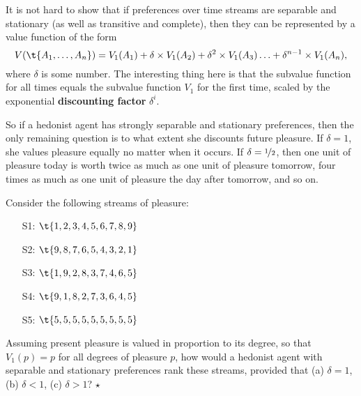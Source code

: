 It is not hard to show that if preferences over time streams are
separable and stationary (as well as transitive and complete), then
they can be represented by a value function of the form
\[
V(\t{A_1,\ldots,A_n}) = V_1(A_1) + \delta \times V_1(A_2) +
\delta^2 \times V_1(A_3) \ldots + \delta^{n-1} \times V_1(A_n),
\]
where $\delta$ is some number. The interesting thing here is that the
subvalue function for all times equals the subvalue function $V_1$ for
the first time, scaled by the exponential \textbf{discounting factor}
$\delta^i$.


So if a hedonist agent has strongly separable and stationary
preferences, then the only remaining question is to what extent she
discounts future pleasure. If $\delta = 1$, she values pleasure
equally no matter when it occurs. If $\delta = \nicefrac{1}{2}$, then
one unit of pleasure today is worth twice as much as one unit of
pleasure tomorrow, four times as much as one unit of pleasure the day
after tomorrow, and so on. 

\begin{exercise}
  Consider the following streams of pleasure:
  \begin{enumerate}
    \itemsep-0.3em 
  \item[S1:] $\t{1,2,3,4,5,6,7,8,9}$ 
  \item[S2:] $\t{9,8,7,6,5,4,3,2,1}$
  \item[S3:] $\t{1,9,2,8,3,7,4,6,5}$ 
  \item[S4:] $\t{9,1,8,2,7,3,6,4,5}$ 
  \item[S5:] $\t{5,5,5,5,5,5,5,5,5}$
  \end{enumerate}
  Assuming present pleasure is valued in proportion to its degree, so
  that $V_1(p) = p$ for all degrees of pleasure $p$, how would a
  hedonist agent with separable and stationary preferences rank these
  streams, provided that (a) $\delta = 1$, (b)
  $\delta < 1$, (c) $\delta > 1$? $\star$
\end{exercise}

